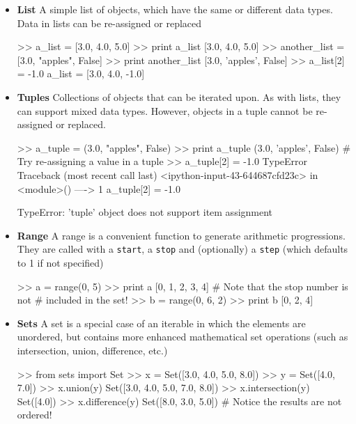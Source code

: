 \begin{itemize}
\item \textbf{List} A simple list of objects, which have the same or different data types. Data in lists can be re-assigned or replaced
\begin{python}[frame=single]
>> a_list = [3.0, 4.0, 5.0]
>> print a_list
[3.0, 4.0, 5.0]
>> another_list = [3.0, "apples", False]
>> print another_list
[3.0, 'apples', False]
>> a_list[2] = -1.0
a_list = [3.0, 4.0, -1.0]
\end{python}

\item \textbf{Tuples} Collections of objects that can be iterated upon. As with lists, they can support mixed data types. However, objects in a tuple cannot be re-assigned or replaced.
\begin{python}[frame=single]
>> a_tuple = (3.0, "apples", False)
>> print a_tuple
(3.0, 'apples', False)
# Try re-assigning a value in a tuple
>> a_tuple[2] = -1.0
TypeError                Traceback (most recent call last)
<ipython-input-43-644687cfd23c> in <module>()
----> 1 a_tuple[2] = -1.0

TypeError: 'tuple' object does not support item assignment
\end{python}

\item \textbf{Range} A range is a convenient function to generate arithmetic progressions. They are called with a \verb=start=, a \verb=stop= and (optionally) a \verb=step= (which defaults to 1 if not specified)

\begin{python}[frame=single]
>> a = range(0, 5)
>> print a
[0, 1, 2, 3, 4]  # Note that the stop number is not 
                 # included in the set!
>> b = range(0, 6, 2)
>> print b
[0, 2, 4]
\end{python}

\item \textbf{Sets} A set is a special case of an iterable in which the elements are unordered, but contains more enhanced mathematical set operations (such as intersection, union, difference, etc.)

\begin{python}[frame=single]
>> from sets import Set
>> x = Set([3.0, 4.0, 5.0, 8.0])
>> y = Set([4.0, 7.0])
>> x.union(y)
Set([3.0, 4.0, 5.0, 7.0, 8.0])
>> x.intersection(y)
Set([4.0])
>> x.difference(y)
Set([8.0, 3.0, 5.0]) # Notice the results are not ordered!
\end{python}
\end{itemize}


